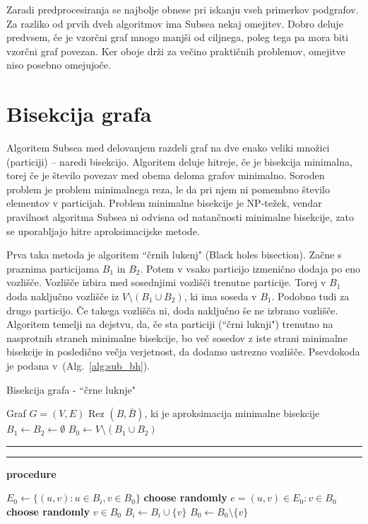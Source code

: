 \documentclass[a4paper, 12pt, ]{book}
\newcommand\Subalg[1]{%
	\Statex%
	\vspace*{-.7\baselineskip}%
	\hspace*{\dimexpr-\algorithmicindent-4pt\relax}%
	\rule{\textwidth}{0.4pt}%
	\Statex%
	
	\vspace*{-.7\baselineskip}%
	\Statex\hspace*{\dimexpr-\algorithmicindent-2pt\relax}%
	\rule{\textwidth}{0.4pt}%
	
	\Statex\hspace*{-\algorithmicindent}\textbf{procedure} #1%
}
\newcommand{\refalg}[1]{(Alg.~\ref{#1})}
\begin{document}
	Zaradi predprocesiranja se najbolje obnese pri iskanju vseh primerkov podgrafov. Za razliko od prvih dveh algoritmov ima Subsea nekaj omejitev. 
	Dobro deluje predvsem, če je vzorčni graf mnogo manjši od ciljnega, poleg tega pa mora biti vzorčni graf povezan. Ker oboje drži za večino praktičnih
	problemov, omejitve niso posebno omejujoče. 

	\section{Bisekcija grafa}
	\label{sub:bisect}
	Algoritem Subsea med delovanjem razdeli graf na dve enako veliki množici (particiji) -- naredi bisekcijo. Algoritem deluje hitreje, če je bisekcija 
	minimalna, torej če je število povezav med obema deloma grafov minimalno. Soroden problem je problem minimalnega reza, le da pri njem ni 
	pomembno število elementov v particijah. Problem minimalne bisekcije je NP-težek, vendar pravilnost algoritma Subsea ni odvisna od natančnosti
	minimalne bisekcije, zato se uporabljajo hitre aproksimacijske metode.

	Prva taka metoda je  algoritem ``črnih lukenj" (Black holes bisection). Začne s praznima particijama $B_1$ in $B_2$. Potem v vsako particijo izmenično
	dodaja po eno vozlišče.
	Vozlišče izbira med sosednjimi vozlišči trenutne particije. Torej v $B_1$ doda naključno vozlišče iz $V \setminus (B_1 \cup B_2)$, ki ima soseda v $B_1$.
	Podobno tudi za drugo particijo. Če takega vozlišča ni, doda naključno še ne izbrano vozlišče. Algoritem temelji na dejstvu, da, če sta particiji (``črni 
	luknji") trenutno na nasprotnih straneh minimalne bisekcije, bo več sosedov z iste strani minimalne bisekcije in posledično večja verjetnost, da
	dodamo ustrezno vozlišče. Psevdokoda je podana v~\refalg{alg:sub_bh}.

\begin{algorithm}
\caption{Bisekcija grafa - ``črne luknje"}
\label{alg:sub_bh}
\begin{algorithmic}[1]
	\Require Graf $G = (V, E)$
	\Ensure Rez $(B, \bar B)$, ki je aproksimacija minimalne bisekcije
	\State $B_1 \gets B_2 \gets \emptyset$
	\State $B_0 \gets V \setminus (B_1 \cup B_2)$
	\Repeat
		\State {}
		\State {}
	
	\Subalg{}

	 \Return \EndIf
	\State $E_0 \gets \{ (u,v): u \in B_i, v \in B_0 \}$
		\State \textbf{choose randomly} $e = (u,v) \in E_0: v \in B_0$
	\Else
		\State \textbf{choose randomly} $v \in B_0$
	\EndIf
	\State $B_i \gets B_i \cup \{ v \}$
	\State $B_0 \gets B_0 \setminus \{ v \}$
\end{algorithmic}
\end{algorithm}
\end{document}
